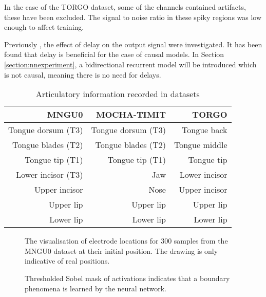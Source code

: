 \documentclass[a4paper]{article}
\begin{document}
In the case of the TORGO dataset, some of the channels contained artifacts,
these have been excluded. The signal to noise
ratio in these spiky regions was low enough to affect
training.

Previously \cite{Gonzalez2016}, the effect of delay on the
output signal were investigated. It has been found that delay
is beneficial for the case of causal models. In Section \ref{section:nnexperiment},
a bidirectional recurrent model will be introduced which is not causal, meaning there is no need for delays.

\begin{table}[th]
  \centering
  \caption{Articulatory information recorded in datasets}
  \label{tab:electrodes}
  \vspace{1em}
  \begin{tabular}{ r r r  }
    \toprule
    \textbf{MNGU0} & \textbf{MOCHA-TIMIT} & \textbf{TORGO} \\ 
    \midrule
    Tongue dorsum (T3) & Tongue dorsum (T3) & Tongue back \\
    Tongue blades (T2) & Tongue blades (T2) & Tongue middle \\
    Tongue tip (T1) & Tongue tip (T1) & Tongue tip \\
    Lower incisor (T3) & Jaw & Lower incisor\\
    Upper incisor & Nose & Upper incisor\\
    Upper lip & Upper lip & Upper lip \\
    Lower lip & Lower lip  & Lower lip\\
    \bottomrule
    \end{tabular}
\end{table}


\begin{figure}[t]
  \begin{center}
    \scalebox{0.50}{}
\end{center}
  \caption{The visualisation of electrode locations for 300 samples from
    the MNGU0 dataset at their initial position. The drawing is only
  indicative of real positions.}
  \label{fig:electrodes}
\end{figure}

\begin{figure}[t]
  \begin{center}
    \scalebox{0.40}{}
\end{center}
\caption{Thresholded Sobel mask of activations indicates that a boundary phenomena is learned by the neural network. }
  \label{fig:mask}
\end{figure}
\end{document}
